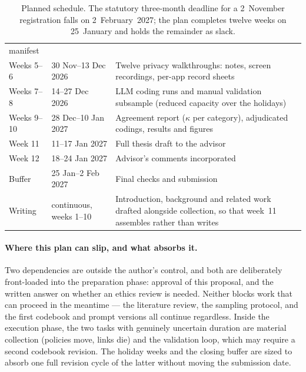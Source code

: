 \begin{table}[!ht]
\begin{tabularx}{\textwidth}{@{}llX@{}}
                                     manifest \\
Weeks 5--6   & 30 Nov--13 Dec 2026 & Twelve privacy walkthroughs: notes,
                                     screen recordings, per-app record sheets \\
Weeks 7--8   & 14--27 Dec 2026     & LLM coding runs and manual validation
                                     subsample (reduced capacity over the
                                     holidays) \\
Weeks 9--10  & 28 Dec--10 Jan 2027 & Agreement report ($\kappa$ per category),
                                     adjudicated codings, results and figures \\
Week 11      & 11--17 Jan 2027     & Full thesis draft to the advisor \\
Week 12      & 18--24 Jan 2027     & Advisor's comments incorporated \\
Buffer       & 25 Jan--2 Feb 2027  & Final checks and submission \\
\addlinespace
Writing      & continuous, weeks 1--10 & Introduction, background and related
                                         work drafted alongside collection, so
                                         that week~11 assembles rather than
                                         writes \\
\bottomrule
\end{tabularx}
\caption{Planned schedule. The statutory three-month deadline for a 2~November
registration falls on 2~February~2027; the plan completes twelve weeks on
25~January and holds the remainder as slack.}
\label{tab:timeline}
\end{table}

\paragraph{Where this plan can slip, and what absorbs it.}
Two dependencies are outside the author's control, and both are deliberately
front-loaded into the preparation phase: approval of this proposal, and the
written answer on whether an ethics review is needed. Neither blocks work that
can proceed in the meantime --- the literature review, the sampling protocol,
and the first codebook and prompt versions all continue regardless. Inside the
execution phase, the two tasks with genuinely uncertain duration are material
collection (policies move, links die) and the validation loop, which may require
a second codebook revision. The holiday weeks and the closing buffer are sized
to absorb one full revision cycle of the latter without moving the submission
date.
